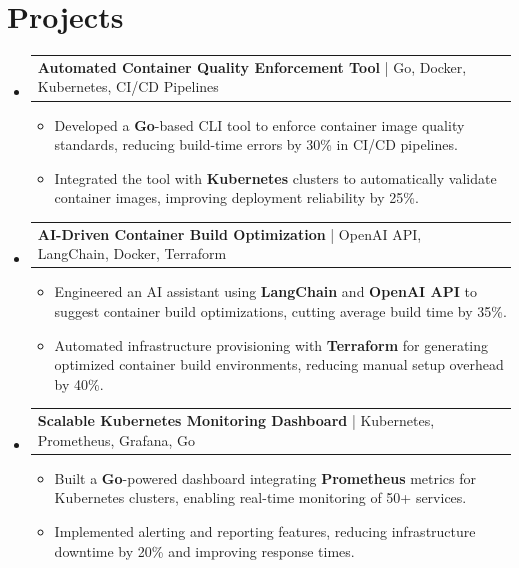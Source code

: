 \documentclass[letterpaper,11pt]{article}
\makeatletter
\newcommand{\resumeItem}[1]{
  \item\footnotesize{
    {#1 \vspace{-2pt}}
  }
}
\newcommand{\resumeProjectHeading}[2]{
    \item
    \begin{tabular*}{1.001\textwidth}{l@{\extracolsep{\fill}}r}
      \small#1 & \textbf{\small #2}\\
    \end{tabular*}\vspace{-7pt}
}
\newcommand{\resumeSubHeadingListStart}{\begin{itemize}[leftmargin=0pt, label={}]}
\newcommand{\resumeSubHeadingListEnd}{\end{itemize}}
\newcommand{\resumeItemListStart}{\begin{itemize}[leftmargin=*]}
\newcommand{\resumeItemListEnd}{\end{itemize}\vspace{-5pt}}
\makeatother
\begin{document}
\section{Projects}
    \vspace{-5pt}
    \resumeSubHeadingListStart
          \resumeProjectHeading
              {\textbf{Automated Container Quality Enforcement Tool} | Go, Docker, Kubernetes, CI/CD Pipelines}{}
        \resumeItemListStart
            \resumeItem{Developed a \textbf{Go}-based CLI tool to enforce container image quality standards, reducing build-time errors by 30\% in CI/CD pipelines.}
            \resumeItem{Integrated the tool with \textbf{Kubernetes} clusters to automatically validate container images, improving deployment reliability by 25\%.}
        \resumeItemListEnd
        \vspace{-12pt}
    
    \resumeProjectHeading
        {\textbf{AI-Driven Container Build Optimization} | OpenAI API, LangChain, Docker, Terraform}{}
        \resumeItemListStart
            \resumeItem{Engineered an AI assistant using \textbf{LangChain} and \textbf{OpenAI API} to suggest container build optimizations, cutting average build time by 35\%.}
            \resumeItem{Automated infrastructure provisioning with \textbf{Terraform} for generating optimized container build environments, reducing manual setup overhead by 40\%.}
        \resumeItemListEnd
          \vspace{-12pt}
      \resumeProjectHeading
          {\textbf{Scalable Kubernetes Monitoring Dashboard} | Kubernetes, Prometheus, Grafana, Go}{}
          \resumeItemListStart
              \resumeItem{Built a \textbf{Go}-powered dashboard integrating \textbf{Prometheus} metrics for Kubernetes clusters, enabling real-time monitoring of 50+ services.}
              \resumeItem{Implemented alerting and reporting features, reducing infrastructure downtime by 20\% and improving response times.}
          \resumeItemListEnd 
    \resumeSubHeadingListEnd
\end{document}
